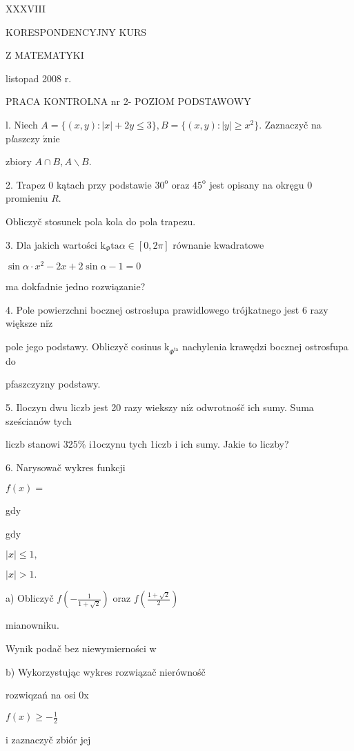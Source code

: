 \documentclass[a4paper,12pt]{article}
\begin{document}
XXXVIII

KORESPONDENCYJNY KURS

Z MATEMATYKI

listopad 2008 r.

PRACA KONTROLNA nr 2- POZIOM PODSTAWOWY

l. Niech $A=\{(x,y):|x|+2y\leq 3\}, B=\{(x,y):|y|\geq x^{2}\}$. Zaznaczyč na p{\it l}aszczy $\acute{\mathrm{z}}\mathrm{n}\mathrm{i}\mathrm{e}$

zbiory $A\cap B, A\backslash B.$

2. Trapez $0$ kątach przy podstawie $30^{\mathrm{o}}$ oraz $45^{\mathrm{o}}$ jest opisany na okręgu $0$ promieniu $R.$

Obliczyč stosunek pola kola do pola trapezu.

3. Dla jakich wartości $\mathrm{k}_{\Phi}\mathrm{t}\mathrm{a}\alpha\in[0,2\pi]$ równanie kwadratowe

$\sin\alpha\cdot x^{2}-2x+2\sin\alpha-1=0$

ma dokfadnie jedno rozwiązanie?

4. Pole powierzchni bocznej ostrosłupa prawidlowego trójkatnego jest 6 razy większe $\mathrm{n}\mathrm{i}\dot{\mathrm{z}}$

pole jego podstawy. Obliczyč cosinus $\mathrm{k}_{\Phi^{\mathrm{t}\mathrm{a}}}$ nachylenia krawędzi bocznej ostrosfupa do

pfaszczyzny podstawy.

5. Iloczyn dwu liczb jest 20 razy wiekszy $\mathrm{n}\mathrm{i}\dot{\mathrm{z}}$ odwrotnośč ich sumy. Suma sześcianów tych

liczb stanowi 325\% i1oczynu tych 1iczb $\mathrm{i}$ ich sumy. Jakie to liczby?

6. Narysowač wykres funkcji

$f(x)=$

gdy

gdy

$|x|\leq 1,$

$|x|>1.$

a) Obliczyč $f(-\displaystyle \frac{1}{1+\sqrt{2}})$ oraz $f(\displaystyle \frac{1+\sqrt{2}}{2})$

mianowniku.

Wynik podač bez niewymierności w

b) Wykorzystując wykres rozwiązač nierównośč

rozwiqzań na osi 0x

$f(x) \geq -\displaystyle \frac{1}{2}$

i zaznaczyč zbiór jej
\end{document}
